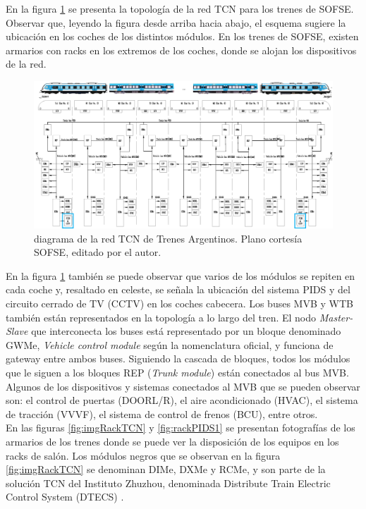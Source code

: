 En la figura \ref{fig:sofseTCN} se presenta la topología de la red TCN para los trenes de SOFSE. Observar que, leyendo la figura desde arriba hacia abajo, el esquema sugiere la ubicación en los coches de los distintos módulos. En los trenes de SOFSE, existen armarios con racks en los extremos de los coches, donde se alojan los dispositivos de la red.\\ \pagebreak

\begin{figure}[H]
	\includegraphics[width=1.8\textwidth, angle=90]{./Figures/diagramaTrenesArgentinosTCN2.png}
	\caption{diagrama de la red TCN de Trenes Argentinos. Plano cortesía SOFSE, editado por el autor.}
	\label{fig:sofseTCN}
\end{figure}


 En la figura \ref{fig:sofseTCN} también se puede observar que varios de los módulos se repiten en cada coche y, resaltado en celeste, se señala la ubicación del sistema PIDS y del circuito cerrado de TV (CCTV) en los coches cabecera. Los buses MVB y WTB también están representados en la topología a lo largo del tren. El nodo \textit{Master-Slave} que interconecta los buses está representado por un bloque denominado GWMe, \textit{Vehicle control module} según la nomenclatura oficial, y funciona de gateway entre ambos buses. Siguiendo la cascada de bloques, todos los módulos que le siguen a los bloques REP (\textit{Trunk module}) están conectados al bus MVB. Algunos de los dispositivos y sistemas conectados al MVB que se pueden observar son: el control de puertas (DOORL/R), el aire acondicionado (HVAC), el sistema de tracción (VVVF), el sistema de control de frenos (BCU), entre otros. \\

En las figuras \ref{fig:imgRackTCN} y \ref{fig:rackPIDS1} se presentan fotografías de los armarios de los trenes donde se puede ver la disposición de los equipos en los racks de salón. Los módulos negros que se observan en la figura \ref{fig:imgRackTCN} se denominan DIMe, DXMe y RCMe, y son parte de la solución TCN del Instituto Zhuzhou, denominada Distribute Train Electric Control System (DTECS)  \cite{feng2016survey}. \\

